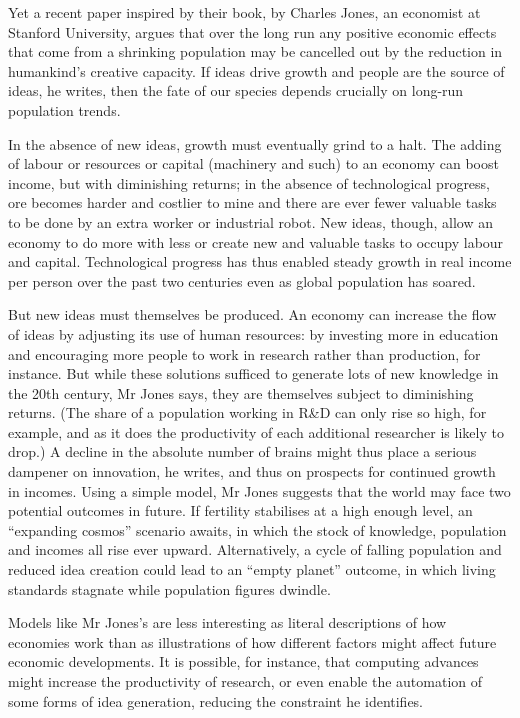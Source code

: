 \documentclass{article}
\begin{document}
Yet a recent paper inspired by their book, by Charles Jones, an economist at Stanford University, argues that over the long run any positive economic effects that come from a shrinking population may be cancelled out by the reduction in humankind's creative capacity. If ideas drive growth and people are the source of ideas, he writes, then the fate of our species depends crucially on long-run population trends. 

In the absence of new ideas, growth must eventually grind to a halt. The adding of labour or resources or capital (machinery and such) to an economy can boost income, but with diminishing returns; in the absence of technological progress, ore becomes harder and costlier to mine and there are ever fewer valuable tasks to be done by an extra worker or industrial robot. New ideas, though, allow an economy to do more with less or create new and valuable tasks to occupy labour and capital. Technological progress has thus enabled steady growth in real income per person over the past two centuries even as global population has soared. 

But new ideas must themselves be produced. An economy can increase the flow of ideas by adjusting its use of human resources: by investing more in education and encouraging more people to work in research rather than production, for instance. But while these solutions sufficed to generate lots of new knowledge in the 20th century, Mr Jones says, they are themselves subject to diminishing returns. (The share of a population working in R\&D can only rise so high, for example, and as it does the productivity of each additional researcher is likely to drop.) A decline in the absolute number of brains might thus place a serious dampener on innovation, he writes, and thus on prospects for continued growth in incomes. Using a simple model, Mr Jones suggests that the world may face two potential outcomes in future. If fertility stabilises at a high enough level, an ``expanding cosmos'' scenario awaits, in which the stock of knowledge, population and incomes all rise ever upward. Alternatively, a cycle of falling population and reduced idea creation could lead to an ``empty planet'' outcome, in which living standards stagnate while population figures dwindle. 

Models like Mr Jones's are less interesting as literal descriptions of how economies work than as illustrations of how different factors might affect future economic developments. It is possible, for instance, that computing advances might increase the productivity of research, or even enable the automation of some forms of idea generation, reducing the constraint he identifies. 
\end{document}
